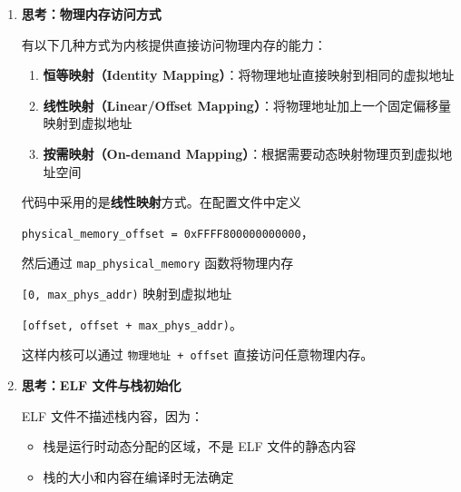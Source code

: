 \documentclass{SYSUReport}
\begin{document}
\begin{enumerate}[label={\chinese*、},labelsep=0pt, start=2]
    该函数是 unsafe 的，因为它直接修改全局可变变量 \texttt{ENTRY}，调用者必须确保入口点地址有效。

    \texttt{entry\_point!} 宏定义在 \texttt{crates/boot/src/lib.rs} 中：

    \begin{verbatim}
#[macro_export]
macro_rules! entry_point {
    ($path:path) => {
        #[unsafe(export_name = "_start")]
        pub extern "C" fn __impl_start(boot_info: &'static $crate::BootInfo) -> ! {
            // validate the signature of the program entry point
            let f: fn(&'static $crate::BootInfo) -> ! = $path;

            f(boot_info)
        }
    };
}
    \end{verbatim}

    该宏将函数导出为 \texttt{\_start} 符号，确保链接器能够正确识别入口点。同时验证函数签名，确保内核入口点接受 \texttt{\&'static BootInfo} 参数并返回 \texttt{!}（永不返回）。

    \item \textbf{思考：物理内存访问方式}

    有以下几种方式为内核提供直接访问物理内存的能力：
    \begin{enumerate}
        \item \textbf{恒等映射（Identity Mapping）}：将物理地址直接映射到相同的虚拟地址
        \item \textbf{线性映射（Linear/Offset Mapping）}：将物理地址加上一个固定偏移量映射到虚拟地址
        \item \textbf{按需映射（On-demand Mapping）}：根据需要动态映射物理页到虚拟地址空间
    \end{enumerate}

    代码中采用的是\textbf{线性映射}方式。在配置文件中定义
    {\raggedright\texttt{physical\_memory\_offset = 0xFFFF800000000000}，\par}
    然后通过 \texttt{map\_physical\_memory} 函数将物理内存
    {\raggedright\texttt{[0, max\_phys\_addr)} 映射到虚拟地址\par}
    {\raggedright\texttt{[offset, offset + max\_phys\_addr)}。\par}
    这样内核可以通过 \texttt{物理地址 + offset} 直接访问任意物理内存。

    \item \textbf{思考：ELF 文件与栈初始化}

    ELF 文件不描述栈内容，因为：
    \begin{itemize}
        \item 栈是运行时动态分配的区域，不是 ELF 文件的静态内容
        \item 栈的大小和内容在编译时无法确定
    \end{itemize}


\end{enumerate}
\end{document}
